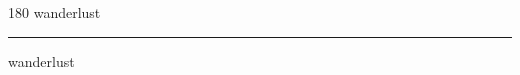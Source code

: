 
\begin{frame}
\begin{center}
\begin{turn}{180}
{\fontsize{2.5cm}{1em}\selectfont wanderlust}
\end{turn}
\vspace{1em}\par  
\hrule
\vspace{1em}\par  
{\fontsize{2.5cm}{1em}\selectfont wanderlust}
\end{center}
\end{frame}
